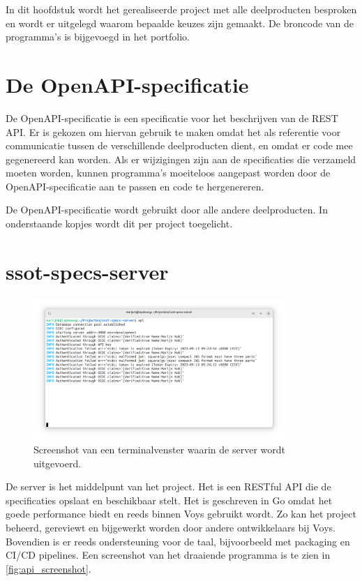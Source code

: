 \documentclass[../report.tex]{subfiles}
\begin{document}
In dit hoofdstuk wordt het gerealiseerde project met alle deelproducten besproken en wordt er uitgelegd waarom bepaalde keuzes zijn gemaakt. De broncode van de programma's is bijgevoegd in het portfolio.

\section{De OpenAPI-specificatie}

De \gls*{OpenAPI-specificatie} is een specificatie voor het beschrijven van de \gls*{REST} \gls*{API}. Er is gekozen om hiervan gebruik te maken omdat het als referentie voor communicatie tussen de verschillende deelproducten dient, en omdat er code mee gegenereerd kan worden. Als er wijzigingen zijn aan de specificaties die verzameld moeten worden, kunnen programma's moeiteloos aangepast worden door de \gls*{OpenAPI-specificatie} aan te passen en code te hergenereren.

De \gls*{OpenAPI-specificatie} wordt gebruikt door alle andere deelproducten. In onderstaande kopjes wordt dit per project toegelicht.

\section{ssot-specs-server}

\begin{figure}[ht]
  \centering
  \includegraphics[width=0.85\textwidth]{assets/images/ssot-specs-server.png}
  \caption{Screenshot van een terminalvenster waarin de server wordt uitgevoerd.}
  \label{fig:api_screenshot}
\end{figure}

De server is het middelpunt van het project. Het is een \gls*{REST}ful \gls*{API} die de specificaties opslaat en beschikbaar stelt. Het is geschreven in \gls*{Go} omdat het goede performance biedt en reeds binnen Voys gebruikt wordt. Zo kan het project beheerd, gereviewt en bijgewerkt worden door andere ontwikkelaars bij Voys. Bovendien is er reeds ondersteuning voor de taal, bijvoorbeeld met packaging en \gls*{CI/CD} pipelines. Een screenshot van het draaiende programma is te zien in \autoref{fig:api_screenshot}.
\end{document}
